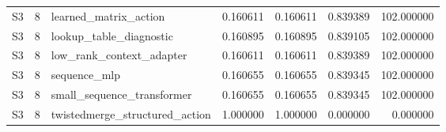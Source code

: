 \begin{tabular}{lrlrrrr}
S3 & 8 & learned_matrix_action & 0.160611 & 0.160611 & 0.839389 & 102.000000 \\
S3 & 8 & lookup_table_diagnostic & 0.160895 & 0.160895 & 0.839105 & 102.000000 \\
S3 & 8 & low_rank_context_adapter & 0.160611 & 0.160611 & 0.839389 & 102.000000 \\
S3 & 8 & sequence_mlp & 0.160655 & 0.160655 & 0.839345 & 102.000000 \\
S3 & 8 & small_sequence_transformer & 0.160655 & 0.160655 & 0.839345 & 102.000000 \\
S3 & 8 & twistedmerge_structured_action & 1.000000 & 1.000000 & 0.000000 & 0.000000 \\
\bottomrule
\end{tabular}
